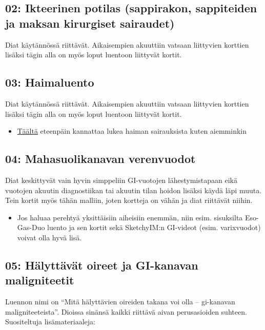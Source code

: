 \documentclass[
]{book}
\providecommand{\tightlist}{%
  \setlength{\itemsep}{0pt}\setlength{\parskip}{0pt}}
\begin{document}
\subsection{02: Ikteerinen potilas (sappirakon, sappiteiden ja maksan kirurgiset sairaudet)}\label{ikteerinen-potilas-sappirakon-sappiteiden-ja-maksan-kirurgiset-sairaudet}

Diat käytännössä riittävät. Aikaisempien akuuttiin vatsaan liittyvien korttien lisäksi tägin alla on myös loput luentoon liittyvät kortit.

\subsection{03: Haimaluento}\label{haimaluento}

Diat käytännössä riittävät. Aikaisempien akuuttiin vatsaan liittyvien korttien lisäksi tägin alla on myös loput luentoon liittyvät kortit.

\begin{itemize}
\tightlist
\item
  \href{https://www.oppiportti.fi/oppikirjat/kia00634}{Täältä} eteenpäin kannattaa lukea haiman sairauksista kuten aiemminkin
\end{itemize}

\subsection{04: Mahasuolikanavan verenvuodot}\label{mahasuolikanavan-verenvuodot}

Diat keskittyvät vain hyvin simppeliin GI-vuotojen lähestymistapaan eikä vuotojen akuutin diagnostiikan tai akuutin tilan hoidon lisäksi käydä läpi muuta. Tein kortit myös tähän malliin, joten kortteja on vähän ja diat riittävät niihin.

\begin{itemize}
\tightlist
\item
  Jos haluaa perehtyä yksittäisiin aiheisiin enemmän, niin esim. sisuksilta Eso-Gas-Duo luento ja sen kortit sekä SketchyIM:n GI-videot (esim. varixvuodot) voivat olla hyvä lisä.
\end{itemize}

\subsection{05: Hälyttävät oireet ja GI-kanavan maligniteetit}\label{Halyttavat-oireet-ja-GI-kanavan-maligniteetit}

Luennon nimi on ``Mitä hälyttävien oireiden takana voi olla -- gi-kanavan maligniteeteista''. Dioissa sinänsä kaikki riittävä aivan perusasioiden suhteen. Suositeltuja lisämateriaaleja:
\end{document}
